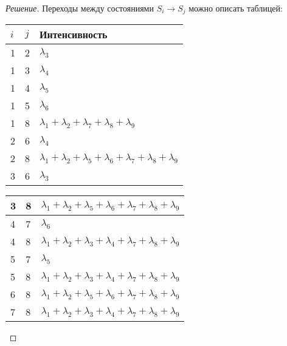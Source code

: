 \documentclass[12pt,a4paper]{article}
\begin{document}
\begin{proof}[Решение]
	Переходы между состояниями $S_i \rightarrow S_j$ можно описать таблицей:
	\begin{table}[h!]
		\centering
		\begin{tabular}{|l|l|l|}
			\hline
			$i$ & $j$ & Интенсивность \\ \hline
			1 & 2 & $\lambda_3$ \\ \hline
			1 & 3 & $\lambda_4$ \\ \hline
			1 & 4 & $\lambda_5$ \\ \hline
			1 & 5 & $\lambda_6$ \\ \hline
			1 & 8 & $\lambda_1 + \lambda_2 + \lambda_7 + \lambda_8 + \lambda_9$ \\ \hline
			2 & 6 & $\lambda_4$ \\ \hline
			2 & 8 & $\lambda_1 + \lambda_2 + \lambda_5 + \lambda_6 + \lambda_7 + \lambda_8 + \lambda_9$ \\ \hline
			3 & 6 & $\lambda_3$ \\ 
		\end{tabular}
	\end{table}
	\begin{table}[h!]
		\centering
		\begin{tabular}{|l|l|l|}
			3 & 8 & $\lambda_1 + \lambda_2 + \lambda_5 + \lambda_6 + \lambda_7 + \lambda_8 + \lambda_9$ \\ \hline
			4 & 7 & $\lambda_6$ \\ \hline
			4 & 8 & $\lambda_1 + \lambda_2 + \lambda_3 + \lambda_4 + \lambda_7 + \lambda_8 + \lambda_9$ \\ \hline
			5 & 7 & $\lambda_5$ \\ \hline
			5 & 8 & $\lambda_1 + \lambda_2 + \lambda_3 + \lambda_4 + \lambda_7 + \lambda_8 + \lambda_9$ \\ \hline 
			6 & 8 & $\lambda_1 + \lambda_2 + \lambda_5 + \lambda_6 + \lambda_7 + \lambda_8 + \lambda_9$ \\ \hline
			7 & 8 & $\lambda_1 + \lambda_2 + \lambda_3 + \lambda_4 + \lambda_7 + \lambda_8 + \lambda_9$\\ \hline
		\end{tabular}
	\end{table}
	

\end{proof}
\end{document}

